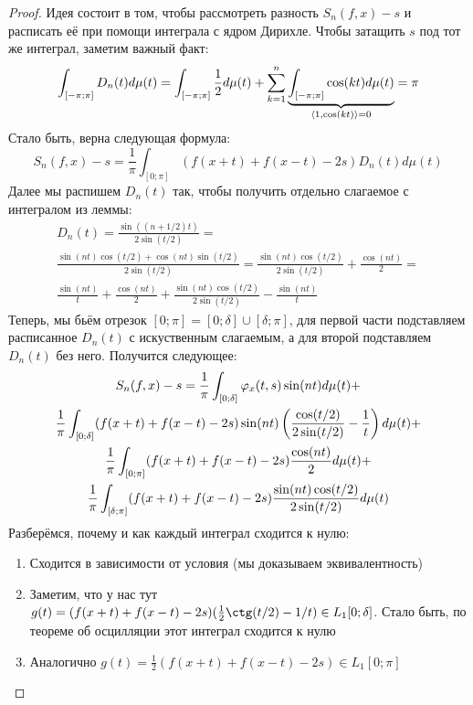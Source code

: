 \begin{proof}
	Идея состоит в том, чтобы рассмотреть разность $S_n(f, x) - s$ и расписать её при помощи интеграла с ядром Дирихле. Чтобы затащить $s$ под тот же интеграл, заметим важный факт:
	\[
		\int_{[-\pi; \pi]} D_n(t)d\mu(t) = \int_{[-\pi; \pi]} \frac{1}{2}d\mu(t) + \sum_{k = 1}^n \underbrace{\int_{[-\pi; \pi]} \cos(kt) d\mu(t)}_{\left\langle1, \cos(kt)\right\rangle = 0} = \pi
	\]
	Стало быть, верна следующая формула:
	\[
		S_n(f, x) - s = \frac{1}{\pi}\int_{[0; \pi]} (f(x + t) + f(x - t) - 2s)D_n(t)d\mu(t)
	\]
	Далее мы распишем $D_n(t)$ так, чтобы получить отдельно слагаемое с интегралом из леммы:
	\begin{multline*}
		D_n(t) = \frac{\sin((n + 1 / 2)t)}{2\sin(t / 2)} =
		\\
		\frac{\sin(nt)\cos(t / 2) + \cos(nt)\sin(t / 2)}{2\sin(t / 2)} = \frac{\sin(nt)\cos(t / 2)}{2\sin(t / 2)} + \frac{\cos(nt)}{2} =
		\\
		\frac{\sin(nt)}{t} + \frac{\cos(nt)}{2} + \frac{\sin(nt)\cos(t / 2)}{2\sin(t / 2)} - \frac{\sin(nt)}{t}
	\end{multline*}
	Теперь, мы бьём отрезок $[0; \pi] = [0; \delta] \cup [\delta; \pi]$, для первой части подставляем расписанное $D_n(t)$ с искуственным слагаемым, а для второй подставляем $D_n(t)$ без него. Получится следующее:
	\begin{multline*}
		S_n(f, x) - s = \frac{1}{\pi}\int_{[0; \delta]} \varphi_x(t, s)\sin(nt)d\mu(t) +
		\\
		\frac{1}{\pi}\int_{[0; \delta]} (f(x + t) + f(x - t) - 2s) \sin(nt) \left(\frac{\cos(t / 2)}{2\sin(t / 2)} - \frac{1}{t}\right)d\mu(t) +
		\\
		\frac{1}{\pi} \int_{[0; \pi]} (f(x + t) + f(x - t) - 2s)\frac{\cos(nt)}{2}d\mu(t) +
		\\
		\frac{1}{\pi} \int_{[\delta; \pi]} (f(x + t) + f(x - t) - 2s) \frac{\sin(nt)\cos(t / 2)}{2\sin(t / 2)}d\mu(t)
  	\end{multline*}
 	Разберёмся, почему и как каждый интеграл сходится к нулю:
 	\begin{enumerate}
 		\item Сходится в зависимости от условия (мы доказываем эквивалентность)
 		
 		\item Заметим, что у нас тут $g(t) = (f(x + t) + f(x - t) - 2s)(\frac{1}{2}\ctg(t / 2) - 1 / t) \in L_1[0; \delta]$. Стало быть, по теореме об осцилляции этот интеграл сходится к нулю
 		
 		\item Аналогично $g(t) = \frac{1}{2}(f(x + t) + f(x - t) - 2s) \in L_1[0; \pi]$
 		

\end{enumerate}
\end{proof}
